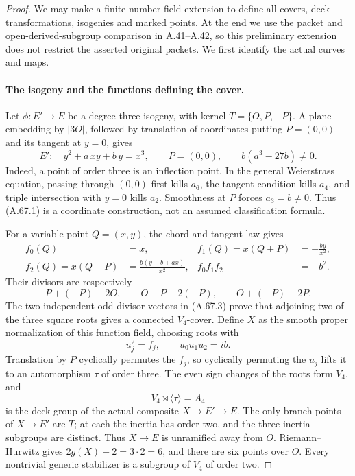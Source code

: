 \begin{proof}
We may make a finite number-field extension to define all covers,
deck transformations, isogenies and marked points. At the end we
use the packet and open-derived-subgroup comparison in A.41--A.42,
so this preliminary extension does not restrict the asserted
original packets. We first identify the actual curves and maps.

\paragraph{The isogeny and the functions defining the cover.}
Let \(\phi:E'\to E\) be a degree-three isogeny, with kernel
\(T=\{O,P,-P\}\). A plane embedding by \(|3O|\), followed by
translation of coordinates putting \(P=(0,0)\) and its tangent
at \(y=0\), gives
\[
 E':\quad y^2+a\,xy+b\,y=x^3,\qquad P=(0,0),
 \qquad b(a^3-27b)\ne0.                                      \tag{A.67.1}
\]
Indeed, a point of order three is an inflection point. In the
general Weierstrass equation, passing through \((0,0)\) first
kills \(a_6\), the tangent condition kills \(a_4\), and triple
intersection with \(y=0\) kills \(a_2\). Smoothness at \(P\)
forces \(a_3=b\ne0\). Thus (A.67.1) is a coordinate construction,
not an assumed classification formula.

For a variable point \(Q=(x,y)\), the chord-and-tangent law gives
\[
\begin{aligned}
 f_0(Q)&=x,&
 f_1(Q)=x(Q+P)&=-\frac{by}{x^2},\\
 f_2(Q)=x(Q-P)&=\frac{b(y+b+ax)}{x^2},&
 f_0f_1f_2&=-b^2.
\end{aligned}                                                 \tag{A.67.2}
\]
Their divisors are respectively
\[
 P+(-P)-2O,\qquad O+P-2(-P),\qquad O+(-P)-2P.
                                                               \tag{A.67.3}
\]
The two independent odd-divisor vectors in (A.67.3) prove that
adjoining two of the three square roots gives a connected
\(V_4\)-cover. Define \(X\) as the smooth proper normalization
of this function field, choosing roots with
\[
 u_j^2=f_j,\qquad u_0u_1u_2=ib.
                                                               \tag{A.67.4}
\]
Translation by \(P\) cyclically permutes the \(f_j\), so cyclically
permuting the \(u_j\) lifts it to an automorphism \(\tau\) of order
three. The even sign changes of the roots form \(V_4\), and
\[
 V_4\rtimes\langle\tau\rangle=A_4
                                                               \tag{A.67.5}
\]
is the deck group of the actual composite \(X\to E'\to E\).
The only branch points of \(X\to E'\) are \(T\); at each the
inertia has order two, and the three inertia subgroups are
distinct. Thus \(X\to E\) is unramified away from \(O\).
Riemann--Hurwitz gives \(2g(X)-2=3\cdot2=6\), and there are six
points over \(O\). Every nontrivial generic stabilizer is a
subgroup of \(V_4\) of order two.


\end{proof}
